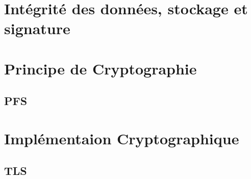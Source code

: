 \section{Intégrité des données, stockage et signature}

\section{Principe de Cryptographie}
\subsection{PFS}

\section{Implémentaion Cryptographique}
\subsection{TLS}
